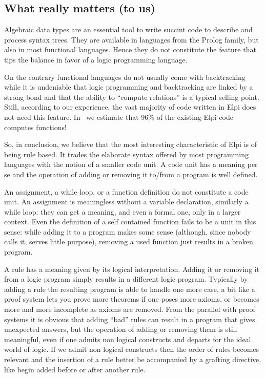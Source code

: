 \documentclass[a4paper, 11pt]{book}
\begin{document}
\subsection{What really matters (to us)}

Algebraic data types are an essential tool to write succint code
to describe and process syntax trees. They are available in languages
from the Prolog family, but also in most functional languages. Hence they do
not constitute the feature that tips the balance in favor of a logic
programming language.

On the contrary functional languages do not usually come with backtracking
while it is undeniable that logic programming and backtracking are linked by
a strong bond and that the ability to ``compute relations'' is a typical
selling point. Still, according to our experience, the vast majority of code
written in Elpi does not need this feature. In~\cite{elpidet} we
estimate that 96\% of the existing Elpi code computes functions!

So, in conclusion, we believe that the most interesting
characteristic of Elpi is of being rule based.
It trades the elaborate syntax offered by most
programming languages with the notion of a smaller code unit.
A code unit has a meaning per se and the operation of adding or removing it
to/from a program is well defined.

An assignment, a while loop, or a function definition do not
constitute a code unit. An assignment is meaningless without a variable
declaration, similarly a while loop: they can get a meaning, and even a formal 
one, only in a larger context. Even the definition of a self contained function fails
to be a unit in this sense: while adding it to a program makes some sense (although,
since nobody calls it, serves little purpose),
removing a used function just results in a broken program.

A rule has a meaning given by its logical interpretation. Adding it or removing
it from a logic program simply results in a different logic program. Typically
by adding a rule the resulting program is able to handle one more case,
a bit like a proof system lets you prove more theorems if one poses
more axioms, or becomes more and more incomplete as axioms are removed.
From the parallel with proof systems it is obvious that adding ``bad'' rules
can result in a program that gives unexpected answers, but the operation
of adding or removing them is still meaningful, even if one admits non logical
constructs and departs for the ideal world of logic.
If we admit non logical
constructs then the order of rules becomes relevant and the insertion of a
rule better be accompanied by a grafting directive, like begin added before
or after another rule.
\end{document}
